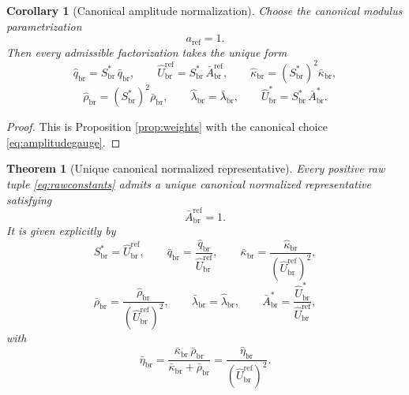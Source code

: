 \documentclass[11pt]{article}
\newcommand{\RespScaleEq}{S_{\mathrm{br}}^{\ast}}
\newcommand{\RespScaleReadout}{\bar q_{\mathrm{br}}}
\newcommand{\RespScaleAmpRef}{\bar A_{\mathrm{br}}^{\mathrm{ref}}}
\newcommand{\RespScaleCov}{\bar\kappa_{\mathrm{br}}}
\newcommand{\RespScaleRelax}{\bar\rho_{\mathrm{br}}}
\newcommand{\RespScaleWell}{\bar\lambda_{\mathrm{br}}}
\newcommand{\RespScaleAmpEq}{\bar A_{\mathrm{br}}^{\ast}}
\newcommand{\RespScaleIso}{\bar\eta_{\mathrm{br}}}
\newcommand{\RespRawReadout}{\widehat q_{\mathrm{br}}}
\newcommand{\RespRawRef}{\widehat U_{\mathrm{br}}^{\mathrm{ref}}}
\newcommand{\RespRawCov}{\widehat\kappa_{\mathrm{br}}}
\newcommand{\RespRawRelax}{\widehat\rho_{\mathrm{br}}}
\newcommand{\RespRawWell}{\widehat\lambda_{\mathrm{br}}}
\newcommand{\RespRawEq}{\widehat U_{\mathrm{br}}^{\ast}}
\newcommand{\RespRawIso}{\widehat\eta_{\mathrm{br}}}
\newtheorem{corollary}{Corollary}
\newtheorem{theorem}{Theorem}
\begin{document}
\begin{corollary}[Canonical amplitude normalization]
\label{cor:canonicalslice}
Choose the canonical modulus parametrization
\begin{equation}
a_{\mathrm{ref}}=1.
\label{eq:amplitudegauge}
\end{equation}
Then every admissible factorization takes the unique form
\begin{equation}
\RespRawReadout=\RespScaleEq\,\RespScaleReadout,
\qquad
\RespRawRef=\RespScaleEq\,\RespScaleAmpRef,
\qquad
\RespRawCov=(\RespScaleEq)^2\RespScaleCov,
\label{eq:forcedfactorA}
\end{equation}
\begin{equation}
\RespRawRelax=(\RespScaleEq)^2\RespScaleRelax,
\qquad
\RespRawWell=\RespScaleWell,
\qquad
\RespRawEq=\RespScaleEq\,\RespScaleAmpEq.
\label{eq:forcedfactorB}
\end{equation}
\end{corollary}

\begin{proof}
This is Proposition \ref{prop:weights} with the canonical choice \eqref{eq:amplitudegauge}.
\end{proof}

\begin{theorem}[Unique canonical normalized representative]
\label{thm:uniquerepresentative}
Every positive raw tuple \eqref{eq:rawconstants} admits a unique canonical normalized representative satisfying
\begin{equation}
\RespScaleAmpRef=1.
\label{eq:slicenormalization}
\end{equation}
It is given explicitly by
\begin{equation}
\RespScaleEq=\RespRawRef,
\qquad
\RespScaleReadout=\frac{\RespRawReadout}{\RespRawRef},
\qquad
\RespScaleCov=\frac{\RespRawCov}{(\RespRawRef)^2},
\label{eq:canonicaldataA}
\end{equation}
\begin{equation}
\RespScaleRelax=\frac{\RespRawRelax}{(\RespRawRef)^2},
\qquad
\RespScaleWell=\RespRawWell,
\qquad
\RespScaleAmpEq=\frac{\RespRawEq}{\RespRawRef},
\label{eq:canonicaldataB}
\end{equation}
with
\begin{equation}
\RespScaleIso=\frac{\RespScaleCov\,\RespScaleRelax}{\RespScaleCov+\RespScaleRelax}
=
\frac{\RespRawIso}{(\RespRawRef)^2}.
\label{eq:canonicaliso}
\end{equation}
\end{theorem}
\end{document}
